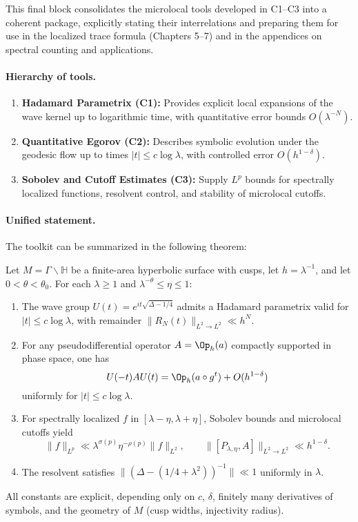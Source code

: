 \noindent
This final block consolidates the microlocal tools developed in C1–C3 into a
coherent package, explicitly stating their interrelations and preparing them
for use in the localized trace formula (Chapters 5–7) and in the appendices
on spectral counting and applications.

\paragraph{Hierarchy of tools.}
\begin{enumerate}
  \item \textbf{Hadamard Parametrix (C1):} Provides explicit local expansions of the
  wave kernel up to logarithmic time, with quantitative error bounds $O(\lambda^{-N})$.
  \item \textbf{Quantitative Egorov (C2):} Describes symbolic evolution under the
  geodesic flow up to times $|t|\le c\log \lambda$, with controlled error $O(h^{1-\delta})$.
  \item \textbf{Sobolev and Cutoff Estimates (C3):} Supply $L^p$ bounds for
  spectrally localized functions, resolvent control, and stability of microlocal cutoffs.
\end{enumerate}

\paragraph{Unified statement.}
The toolkit can be summarized in the following theorem:

\begin{theorem}\label{thm:C4-toolkit}
Let $M=\Gamma\backslash\mathbb H$ be a finite-area hyperbolic surface with cusps,
let $h=\lambda^{-1}$, and let $0<\theta<\theta_0$.
For each $\lambda\ge 1$ and $\lambda^{-\theta}\le \eta\le 1$:

\begin{enumerate}
  \item The wave group $U(t)=e^{it\sqrt{\Delta-1/4}}$ admits a Hadamard parametrix
  valid for $|t|\le c\log \lambda$, with remainder $\|R_N(t)\|_{L^2\to L^2}\ll h^N$.
  \item For any pseudodifferential operator $A=\Op_h(a)$ compactly supported in phase
  space, one has
  \[
  U(-t)AU(t)=\Op_h(a\circ g^t)+O(h^{1-\delta})
  \]
  uniformly for $|t|\le c\log \lambda$.
  \item For spectrally localized $f$ in $[\lambda-\eta,\lambda+\eta]$, Sobolev bounds
  and microlocal cutoffs yield
  \[
  \|f\|_{L^p}\ll \lambda^{\sigma(p)}\eta^{-\rho(p)}\|f\|_{L^2},\qquad
  \|[P_{\lambda,\eta},A]\|_{L^2\to L^2}\ll h^{1-\delta}.
  \]
  \item The resolvent satisfies $\|(\Delta-(1/4+\lambda^2))^{-1}\|\ll 1$ uniformly in $\lambda$.
\end{enumerate}
All constants are explicit, depending only on $c$, $\delta$, finitely many derivatives
of symbols, and the geometry of $M$ (cusp widths, injectivity radius).
\end{theorem}

